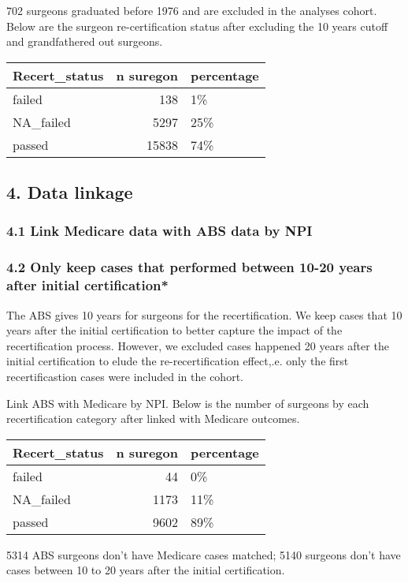 \documentclass[
]{article}
\begin{document}
702 surgeons graduated before 1976 and are excluded in the analyses
cohort. Below are the surgeon re-certification status after excluding
the 10 years cutoff and grandfathered out surgeons.

\begin{table}[H]
\centering
\begin{tabular}{l|r|l}
\hline
Recert\_status & n suregon & percentage\\
\hline
failed & 138 & 1\%\\
\hline
NA\_failed & 5297 & 25\%\\
\hline
passed & 15838 & 74\%\\
\hline
\end{tabular}
\end{table}

\hypertarget{data-linkage}{%
\subsection{4. Data linkage}\label{data-linkage}}

\hypertarget{link-medicare-data-with-abs-data-by-npi}{%
\subsubsection{4.1 Link Medicare data with ABS data by
NPI}\label{link-medicare-data-with-abs-data-by-npi}}

\hypertarget{only-keep-cases-that-performed-between-10-20-years-after-initial-certification}{%
\subsubsection{4.2 Only keep cases that performed between 10-20 years
after initial
certification*}\label{only-keep-cases-that-performed-between-10-20-years-after-initial-certification}}

The ABS gives 10 years for surgeons for the recertification. We keep
cases that 10 years after the initial certification to better capture
the impact of the recertification process. However, we excluded cases
happened 20 years after the initial certification to elude the
re-recertification effect,.e. only the first recertificastion cases were
included in the cohort.

Link ABS with Medicare by NPI. Below is the number of surgeons by each
recertification category after linked with Medicare outcomes.

\begin{table}[H]
\centering
\begin{tabular}{l|r|l}
\hline
Recert\_status & n suregon & percentage\\
\hline
failed & 44 & 0\%\\
\hline
NA\_failed & 1173 & 11\%\\
\hline
passed & 9602 & 89\%\\
\hline
\end{tabular}
\end{table}

5314 ABS surgeons don't have Medicare cases matched; 5140 surgeons don't
have cases between 10 to 20 years after the initial certification.
\end{document}
